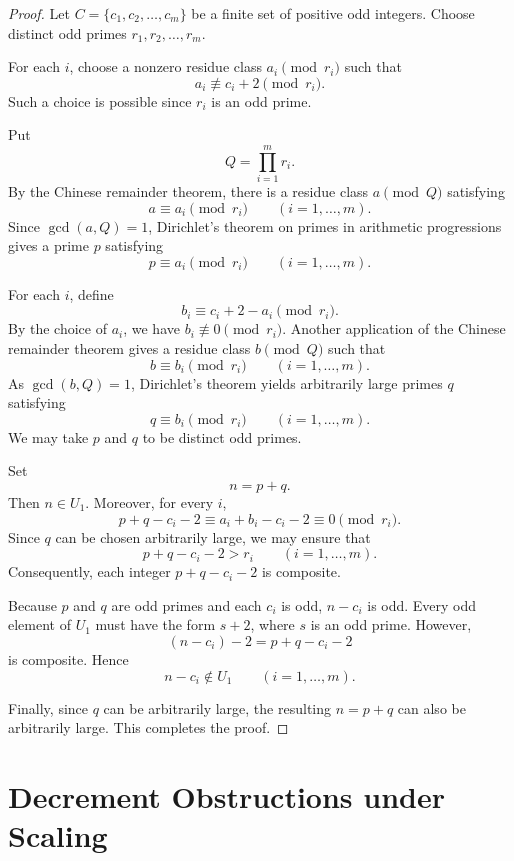 \documentclass[11pt]{article}
\begin{document}
	\begin{proof}
		Let \(C=\{c_1,c_2,\ldots,c_m\}\) be a finite set of positive
		odd integers. Choose distinct odd primes
		\(r_1,r_2,\ldots,r_m\).
		
		For each \(i\), choose a nonzero residue class \(a_i\pmod{r_i}\)
		such that
		\[
		a_i\not\equiv c_i+2\pmod{r_i}.
		\]
		Such a choice is possible since \(r_i\) is an odd prime.
		
		Put
		\[
		Q=\prod_{i=1}^m r_i.
		\]
		By the Chinese remainder theorem, there is a residue class
		\(a\pmod Q\) satisfying
		\[
		a\equiv a_i\pmod{r_i}
		\qquad (i=1,\ldots,m).
		\]
		Since \(\gcd(a,Q)=1\), Dirichlet's theorem on primes in arithmetic
		progressions gives a prime \(p\) satisfying
		\[
		p\equiv a_i\pmod{r_i}
		\qquad (i=1,\ldots,m).
		\]
		
		For each \(i\), define
		\[
		b_i\equiv c_i+2-a_i\pmod{r_i}.
		\]
		By the choice of \(a_i\), we have \(b_i\not\equiv0\pmod{r_i}\).
		Another application of the Chinese remainder theorem gives a
		residue class \(b\pmod Q\) such that
		\[
		b\equiv b_i\pmod{r_i}
		\qquad (i=1,\ldots,m).
		\]
		As \(\gcd(b,Q)=1\), Dirichlet's theorem yields arbitrarily large
		primes \(q\) satisfying
		\[
		q\equiv b_i\pmod{r_i}
		\qquad (i=1,\ldots,m).
		\]
		We may take \(p\) and \(q\) to be distinct odd primes.
		
		Set
		\[
		n=p+q.
		\]
		Then \(n\in U_1\). Moreover, for every \(i\),
		\[
		p+q-c_i-2
		\equiv a_i+b_i-c_i-2
		\equiv0\pmod{r_i}.
		\]
		Since \(q\) can be chosen arbitrarily large, we may ensure that
		\[
		p+q-c_i-2>r_i
		\qquad (i=1,\ldots,m).
		\]
		Consequently, each integer \(p+q-c_i-2\) is composite.
		
		Because \(p\) and \(q\) are odd primes and each \(c_i\) is odd,
		\(n-c_i\) is odd. Every odd element of \(U_1\) must have the form
		\(s+2\), where \(s\) is an odd prime. However,
		\[
		(n-c_i)-2=p+q-c_i-2
		\]
		is composite. Hence
		\[
		n-c_i\notin U_1
		\qquad (i=1,\ldots,m).
		\]
		
		Finally, since \(q\) can be arbitrarily large, the resulting
		\(n=p+q\) can also be arbitrarily large. This completes the proof.
	\end{proof}
	
	\section{Decrement Obstructions under Scaling}
	
	
	
\end{document}
